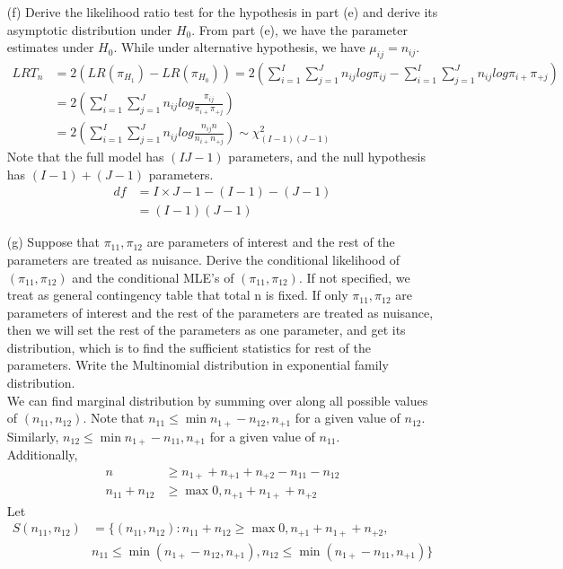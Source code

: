 \documentclass[11pt]{article} %
\begin{document}
\begin{itemize}
\item[(f)] Derive the likelihood ratio test for the hypothesis in part (e) and derive its asymptotic distribution under $H_0$.
From part (e), we have the parameter estimates under $H_0$. While under alternative hypothesis, we have $\mu_{ij} = n_{ij}$. 
\begin{align*}
	LRT_n &= 2(LR(\pi_{H_1}) - LR(\pi_{H_0})) =2\left( \sum_{i=1}^I \sum_{j=1}^J n_{ij} log \pi_{ij} - \sum_{i=1}^I \sum_{j=1}^J n_{ij} log \pi_{i+} \pi_{+j} \right)\\
	&= 2\left( \sum_{i=1}^I \sum_{j=1}^J n_{ij} log \frac{\pi_{ij}}{\pi_{i+} \pi_{+j} }   \right)\\
	&= 2\left( \sum_{i=1}^I \sum_{j=1}^J n_{ij} log \frac{n_{ij} n}{n_{i+} n_{+j} }   \right) \sim \chi^2_{(I-1)(J-1)} 
\end{align*}
Note that the full model has $(IJ-1)$ parameters, and the null hypothesis has $(I-1)+ (J-1)$ parameters.
\begin{align*}
	df &= I \times J-1 - (I-1) - (J-1)\\
	&= (I-1)(J-1)
\end{align*}

\item[(g)] Suppose that $\pi_{11}, \pi_{12}$ are parameters of interest and the rest of the parameters are treated as nuisance. Derive the conditional likelihood of $(\pi_{11}, \pi_{12})$ and the conditional MLE's of  $(\pi_{11}, \pi_{12})$.
If not specified, we treat as general contingency table that total n is fixed. If only $\pi_{11}, \pi_{12}$ are parameters of interest and the rest of the parameters are treated as nuisance, then we will set the rest of the parameters as one parameter, and get its distribution, which is to find the sufficient statistics for rest of the parameters.
Write the Multinomial distribution in exponential family distribution.\\
We can find marginal distribution by summing over along all possible values of $(n_{11}, n_{12})$. Note that $n_{11} \leq \min{n_{1+} - n_{12}, n_{+1}}$ for a given value of $n_{12}$. Similarly, $n_{12} \leq \min{n_{1+}- n_{11}, n_{+1}}$ for a given value of $n_{11}$. \\
Additionally,
\begin{align*}
	n & \geq n_{1+} + n_{+1} + n_{+2} - n_{11} - n_{12} \\
	n_{11} + n_{12} & \geq \max{ 0, n_{+1} + n_{1+} + n_{+2}}
\end{align*}
Let
\begin{align*}
	S(n_{11}, n_{12}) &= \{(n_{11}, n_{12}): n_{11} + n_{12} \geq \max{ 0, n_{+1} + n_{1+} + n_{+2}},\\
	&  n_{11} \leq \min{(n_{1+} - n_{12}, n_{+1})}, n_{12} \leq \min{(n_{1+}- n_{11}, n_{+1})}   \} 
\end{align*}


\end{itemize}
\end{document}

